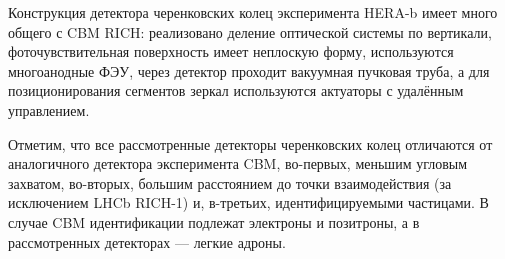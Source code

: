 Конструкция детектора черенковских колец эксперимента \mbox{HERA-b} имеет много общего с CBM RICH: 
реализовано деление оптической системы по вертикали,
фоточувствительная поверхность имеет неплоскую форму,
используются многоанодные ФЭУ,
через детектор проходит вакуумная пучковая труба,
а для позиционирования сегментов зеркал используются актуаторы с удалённым управлением.


Отметим, что все рассмотренные детекторы черенковских колец отличаются от аналогичного детектора эксперимента CBM, во-первых, меньшим угловым захватом, во-вторых, большим расстоянием до точки взаимодействия (за исключением LHCb \mbox{RICH-1}) и, в-третьих, идентифицируемыми частицами. В случае CBM идентификации подлежат электроны и позитроны, а в рассмотренных детекторах --- легкие адроны.
